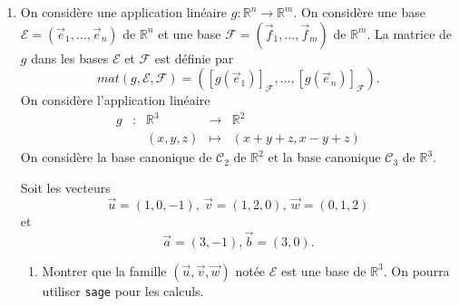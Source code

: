 \documentclass[a4paper,12pt]{article}
\def\R{\mathbb{R}}
\begin{document}
\begin{exercice}
\begin{enumerate}
{$$\begin{aligned}
                     y+t&=2\\
                     z+t&=3
                 \end{aligned}
                 \right.
                 \iff
                 \left\{
                 \begin{aligned}
                     x&=-1\\
                     y&=0\\
                     z&=1\\
                     t&=2
                 \end{aligned}
                 \right.
                 $$
                 Donc $(1,2,3)=(-1,0,1)_G+(2,2,2)_D$. Par définition, la décomposition de (1,2,3) avec $G$ et $D$ est unique.
             }
         \item On considère une application linéaire $g:\R^n \to \R^m$.
             On considère une base $\mathcal E= (\vec e_1,\dots, \vec e_n)$ de $\R^n$ et une base 
             $\mathcal F = (\vec f_1,\dots,\vec f_m)$ de $\R^m$. La matrice de $g$ dans les bases $\mathcal E$ et $\mathcal F$ est définie par 
             $$mat(g,\mathcal E, \mathcal F)=\left([g(\vec e_1)]_{\mathcal F},\dots,[g(\vec e_n)]_{\mathcal F} \right).$$
             On considère l'application linéaire
             $$
             \begin{array}{ccccc}
                 g & : & \R^3 & \to & \R^2 \\
                   &   & (x,y,z) & \mapsto & (x+y+z,x-y+z)
               \end{array}
             $$
             On considère la base canonique de $\mathcal C_2$ de $\R^2$ et la base canonique $\mathcal C_3$ de $\R^3$.

             Soit les vecteurs 
             $$\vec u = (1,0,-1),\: \vec v = (1,2,0), \: \vec w=(0,1,2)$$
             et
             $$\vec a = (3,-1), \vec b = (3,0).$$
             \begin{enumerate}
                 \item Montrer que la famille $(\vec u, \vec v, \vec w)$ notée $\mathcal E$ est une base de $\R^3$. 
                     On pourra utiliser {\tt sage} pour les calculs.


\end{enumerate}
\end{enumerate}
\end{exercice}
\end{document}
